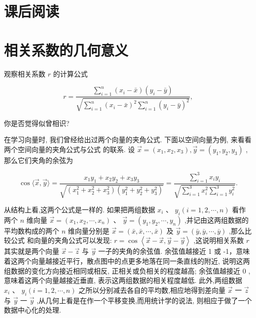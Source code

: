 \documentclass[10pt]{article}
\newcommand*\circled[1]{\tikz[baseline=(char.base)]{\node[shape=circle,draw,inner sep=1.5pt] (char) {\small #1};}}
\begin{document}
\section*{课后阅读}

\section*{相关系数的几何意义}

观察相关系数 \(r\) 的计算公式

\[
r = \frac{\mathop{\sum }\limits_{{i = 1}}^{n}\left( {{x}_{i} - \bar{x}}\right) \left( {{y}_{i} - \bar{y}}\right) }{\sqrt{\mathop{\sum }\limits_{{i = 1}}^{n}{\left( {x}_{i} - \bar{x}\right) }^{2}\mathop{\sum }\limits_{{i = 1}}^{n}{\left( {y}_{i} - \bar{y}\right) }^{2}}},
\]
  \circled{1} 

你是否觉得似曾相识?

在学习向量时, 我们曾经给出过两个向量的夹角公式. 下面以空间向量为例, 来看看两个空间向量的夹角公式与公式 \circled{1} 的联系. 设 \(\overrightarrow{x} = \left( {{x}_{1},{x}_{2},{x}_{3}}\right) ,\overrightarrow{y} = \left( {{y}_{1},{y}_{2},{y}_{3}}\right)\) ,那么它们夹角的余弦为



\[
\cos \langle \overrightarrow{x},\overrightarrow{y}\rangle  = \frac{{x}_{1}{y}_{1} + {x}_{2}{y}_{2} + {x}_{3}{y}_{3}}{\sqrt{\left( {{x}_{1}^{2} + {x}_{2}^{2} + {x}_{3}^{2}}\right) \left( {{y}_{1}^{2} + {y}_{2}^{2} + {y}_{3}^{2}}\right) }} = \frac{\mathop{\sum }\limits_{{i = 1}}^{3}{x}_{i}{y}_{i}}{\sqrt{\mathop{\sum }\limits_{{i = 1}}^{3}{x}_{i}^{2}\mathop{\sum }\limits_{{i = 1}}^{3}{y}_{i}^{2}}}.
\]

从结构上看,这两个公式是一样的. 如果把两组数据 \({x}_{i}\text{ 、 }{y}_{i}\left( {i = 1,2,\cdots ,n}\right)\) 看作两个 \(n\) 维向量 \(\overrightarrow{x} = \left( {{x}_{1},{x}_{2},\cdots ,{x}_{n}}\right) \text{ 、 }\overrightarrow{y} = \left( {{y}_{1},{y}_{2},\cdots ,{y}_{n}}\right)\) ,并记由这两组数据的平均数构成的两个 \(n\) 维向量分别是 \(\overrightarrow{x} = \left( {\bar{x},\bar{x},\cdots ,\bar{x}}\right)\) 及 \(\overrightarrow{y} = \left( {\bar{y},\bar{y},\cdots ,\bar{y}}\right)\) ,那么比较公式 \circled{1} 和向量的夹角公式可以发现: \(r = \cos \left\langle  {\overrightarrow{x} - \overrightarrow{x},\overrightarrow{y} - \overrightarrow{y}}\right\rangle\) ,这说明相关系数 \(r\) 其实就是两个向量 \(\overrightarrow{x} - \overrightarrow{z}\) 与 \(\overrightarrow{y}\) 一子的夹角的余弦值. 余弦值越接近 1 或 -1，意味着这两个向量越接近平行，散点图中的点更多地落在同一条直线的附近, 说明这两组数据的变化方向接近相同或相反, 正相关或负相关的程度越高; 余弦值越接近 0 , 意味着这两个向量越接近垂直, 表示这两组数据的相关程度越低. 此外,两组数据 \({x}_{i}\text{ 、 }{y}_{i}\left( {i = 1,2,\cdots ,n}\right)\) 之所以分别减去各自的平均数,相应地得到差向量 \(\overrightarrow{x}\) 一 \(\overrightarrow{z}\) 与 \(\overrightarrow{y}\) 一 \(\overrightarrow{y}\) ,从几何上看是在作一个平移变换,而用统计学的说法, 则相应于做了一个数据中心化的处理.
\end{document}
